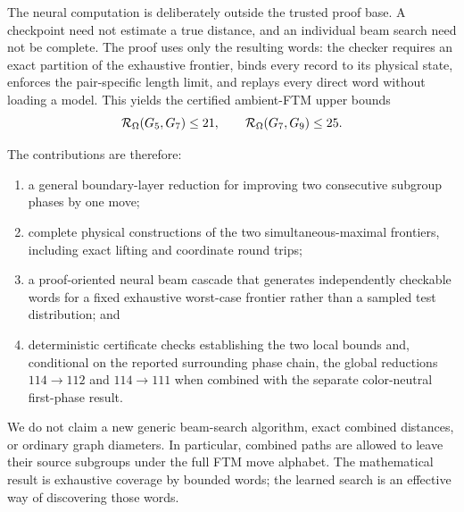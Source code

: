 The neural computation is deliberately outside the trusted proof base.  A
checkpoint need not estimate a true distance, and an individual beam search
need not be complete.  The proof uses only the resulting words: the checker
requires an exact partition of the exhaustive frontier, binds every record to
its physical state, enforces the pair-specific length limit, and replays every
direct word without loading a model.  This yields the certified ambient-FTM
upper bounds
\[
  \mathcal{R}_{\Omega}(G_{5},G_{7})\le21,
  \qquad
  \mathcal{R}_{\Omega}(G_{7},G_{9})\le25.
\]

The contributions are therefore:
\begin{enumerate}
  \item a general boundary-layer reduction for improving two consecutive
    subgroup phases by one move;
  \item complete physical constructions of the two simultaneous-maximal
    frontiers, including exact lifting and coordinate round trips;
  \item a proof-oriented neural beam cascade that generates independently
    checkable words for a fixed exhaustive worst-case frontier rather
    than a sampled test distribution; and
  \item deterministic certificate checks establishing the two local
    bounds and, conditional on the reported surrounding phase chain, the
    global reductions $114\to112$ and $114\to111$ when combined with the
    separate color-neutral first-phase result.
\end{enumerate}

We do not claim a new generic beam-search algorithm, exact combined distances,
or ordinary graph diameters.  In particular, combined paths are allowed to
leave their source subgroups under the full FTM move alphabet.  The
mathematical result is exhaustive coverage by bounded words; the learned
search is an effective way of discovering those words.

